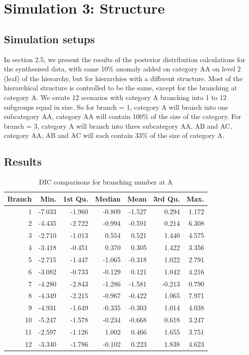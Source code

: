 \newpage

\section{Simulation 3: Structure }

\subsection{Simulation setups }

In section 2.5, we present the results of the posterior distribution calculations for the synthesised data, with same 10\% anomaly added on category AA on level 2 (leaf) of the hierarchy, but for hierarchies with a different structure. Most of the hierarchical structure is controlled to be the same, except for the branching at category A. We create 12 scenarios with category A branching into 1 to 12 subgroups equal in size. So for branch = 1,  category A will branch into one subcategory AA, category AA will contain 100\% of the size of the category. For branch = 3, category A will branch into three subcategory AA, AB and AC, category AA, AB and AC will each contain 33\% of the size of category A. 

\subsection{Results}

\begin{table}[ht]
	\centering
	\begin{tabular}{rrrrrrr}
		\hline
		Branch & Min. & 1st Qu. & Median & Mean & 3rd Qu. & Max. \\ 
		\hline
		1 & -7.033 & -1.960 & -0.809 & -1.527 & 0.294 & 1.172 \\ 
		2 & -4.435 & -2.722 & -0.994 & -0.591 & 0.214 & 6.308 \\ 
		3 & -2.710 & -1.013 & 0.554 & 0.521 & 1.440 & 4.575 \\ 
		4 & -3.418 & -0.451 & 0.370 & 0.305 & 1.422 & 3.356 \\ 
		5 & -2.715 & -1.447 & -1.065 & -0.318 & 1.022 & 2.791 \\ 
		6 & -3.082 & -0.733 & -0.129 & 0.121 & 1.042 & 4.216 \\ 
		7 & -4.280 & -2.843 & -1.286 & -1.581 & -0.213 & 0.790 \\ 
		8 & -4.349 & -2.215 & -0.967 & -0.422 & 1.065 & 7.971 \\ 
		9 & -4.931 & -1.649 & -0.335 & -0.303 & 1.014 & 4.038 \\ 
		10 & -5.247 & -1.578 & -0.234 & -0.668 & 0.618 & 3.247 \\ 
		11 & -2.597 & -1.126 & 1.002 & 0.466 & 1.655 & 3.751 \\ 
		12 & -3.340 & -1.786 & -0.102 & 0.223 & 1.838 & 4.623 \\ 
		\hline
	\end{tabular}
	\caption{DIC comparisons for branching number at A} 
	\label{tab:dicanomaly2}
\end{table}

